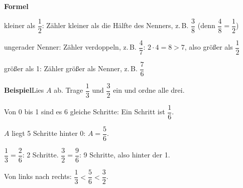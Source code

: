 \documentclass[11pt]{article}
\begin{document}
\noindent\textbf{Formel}\par\nopagebreak\noindent\hspace*{4mm}\begin{minipage}{\dimexpr\linewidth-4mm\relax}kleiner als $\dfrac{1}{2}$: Zähler kleiner als die Hälfte des Nenners, z.\,B. $\dfrac{3}{8}$ (denn $\dfrac{4}{8} = \dfrac{1}{2}$) \par\vspace{4pt} ungerader Nenner: Zähler verdoppeln, z.\,B. $\dfrac{4}{7}$: $2 \cdot 4 = 8 > 7$, also größer als $\dfrac{1}{2}$ \par\vspace{4pt} größer als 1: Zähler größer als Nenner, z.\,B. $\dfrac{7}{6}$\end{minipage}\par\medskip
\noindent\textbf{Beispiel}\quad Lies $A$ ab. Trage $\dfrac{1}{3}$ und $\dfrac{3}{2}$ ein und ordne alle drei.\par\smallskip
\noindent\begin{minipage}[t]{0.6\linewidth}\vspace{0pt}\par\noindent{}Von 0 bis 1 sind es 6 gleiche Schritte: Ein Schritt ist $\dfrac{1}{6}$.\par\smallskip\par\noindent{}$A$ liegt 5 Schritte hinter 0: $A = \dfrac{5}{6}$.\par\smallskip\par\noindent{}$\dfrac{1}{3} = \dfrac{2}{6}$: 2 Schritte. \quad $\dfrac{3}{2} = \dfrac{9}{6}$: 9 Schritte, also hinter der 1.\par\smallskip\par\noindent{}Von links nach rechts: $\dfrac{1}{3} < \dfrac{5}{6} < \dfrac{3}{2}$.\par\smallskip\end{minipage}\hfill
\end{document}
